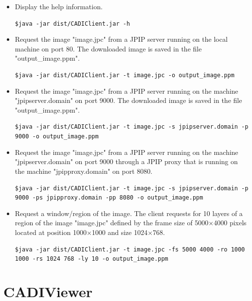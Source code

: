 \documentclass[a4paper,10pt]{article}
\begin{document}
\begin{itemize}
	\item Display the help information.
	\begin{framed}
	\texttt{\$java -jar dist/CADIClient.jar -h}
	\end{framed}
	
	\item Request the image "image.jpc" from a JPIP server running on the local
machine on port 80. The downloaded image is saved in the file "output\_image.ppm".
	\begin{framed}
	\texttt{\$java -jar dist/CADIClient.jar -t image.jpc -o output\_image.ppm}
	\end{framed}
	
	\item Request the image "image.jpc" from a JPIP server running on the machine
	"jpipserver.domain" on port 9000. The downloaded image is saved in the file
	"output\_image.ppm".
	\begin{framed}
	\texttt{\$java -jar dist/CADIClient.jar -t image.jpc -s jpipserver.domain -p 9000 -o output\_image.ppm}
	\end{framed}
	
	\item Request the image "image.jpc" from a JPIP server running on the machine
	"jpipserver.domain" on port 9000 through a JPIP proxy that is running on the machine "jpipproxy.domain" on port 8080.
	\begin{framed}
	\texttt{\$java -jar dist/CADIClient.jar -t image.jpc -s jpipserver.domain -p 9000 -ps jpipproxy.domain -pp 8080 -o output\_image.ppm}
	\end{framed}
	
	\item Request a window/region of the image. The client requests for 10 layers
	of a region of the image "image.jpc" defined by the frame size of
	5000$\times$4000 pixels located at position 1000$\times$1000 and size
	1024$\times$768.
	\begin{framed}
	\texttt{\$java -jar dist/CADIClient.jar -t image.jpc -fs 5000 4000 -ro 1000 1000 -rs 1024 768 -ly 10 -o output\_image.ppm}
	\end{framed}

\end{itemize}


\newpage
\section{CADIViewer}
\label{sect:viewer}
\end{document}
